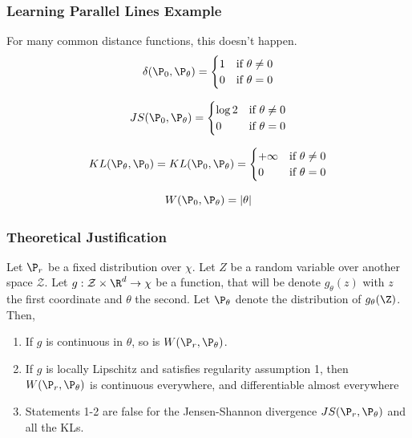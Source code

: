 \documentclass{beamer}
\begin{document}
\begin{frame}
\frametitle{Learning Parallel Lines Example}
For many common distance functions, this doesn't happen.
\pause
\begin{equation*}
\delta(\P_{0},\P_{\theta}) = \begin{cases}
1 &\text{if $\theta \neq 0$}\\    
0 &\text{if $\theta = 0$}
\end{cases}
\end{equation*}

\begin{equation*}
JS(\P_{0},\P_{\theta}) = \begin{cases}
\log 2 &\text{if $\theta \neq 0$}\\    
0 &\text{if $\theta = 0$}
\end{cases}
\end{equation*}

\begin{equation*}
KL(\P_{\theta}, \P_{0}) = KL(\P_{0},\P_{\theta}) = \begin{cases}
+\infty &\text{if $\theta \neq 0$}\\    
0 &\text{if $\theta = 0$}
\end{cases}
\end{equation*}

$$W(\P_{0},\P_{\theta}) = |\theta|$$

\end{frame}

\begin{frame}
\frametitle{Theoretical Justification}
\begin{Theorem}[1]
Let $\P_{r}$ be a fixed distribution over $\chi$. Let $Z$ be a random variable over another space $\mathcal{Z}$. Let $g: \mathcal{Z} \times \R^{d} \to \chi$ be a function, that will be denote $g_{\theta}(z)$ with $z$ the first coordinate and $\theta$ the second. Let $\P_{\theta}$ denote the distribution of $g_{\theta}(\Z)$. Then,
\begin{enumerate}
\item{If $g$ is continuous in $\theta$, so is $W(\P_{r},\P_{\theta})$.}
\item{If $g$ is locally Lipschitz and satisfies regularity assumption 1, then $W(\P_{r},\P_{\theta})$ is continuous everywhere, and differentiable almost everywhere}
\item{Statements 1-2 are false for the Jensen-Shannon divergence $JS(\P_{r}, \P_{\theta})$ and all the KLs.}
\end{enumerate}
\end{Theorem}
\end{frame}
\end{document}
